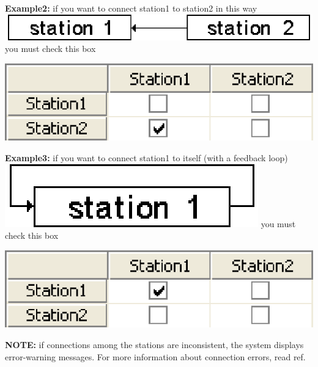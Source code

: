 \textbf{Example2:} if you want to connect station1 to station2 in this way \includegraphics[scale=.5]{img/jsim/es2.eps} you must check this box
\begin{center}
\includegraphics[scale=.5]{img/jsim/connection2.eps}
\end{center}
\textbf{Example3:} if you want to connect station1 to itself (with a feedback loop) \includegraphics[scale=.5]{img/jsim/es3.eps} you must check this box
\begin{center}
\includegraphics[scale=.5]{img/jsim/connection3.eps}
\end{center}
\textbf{NOTE: }if connections among the stations are inconsistent, the system displays error-warning messages. For more information about connection errors, read ref{}.

